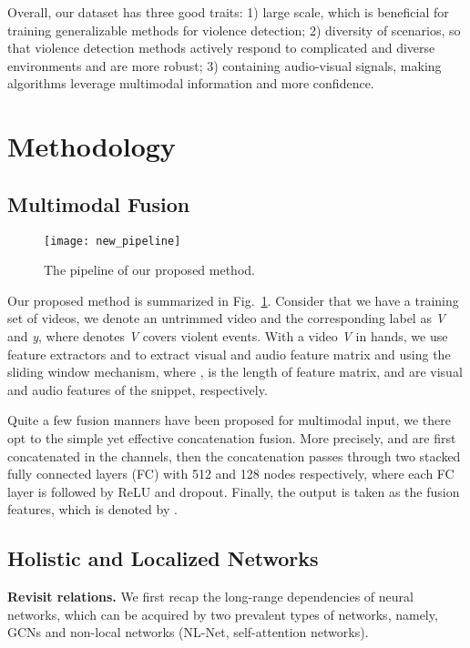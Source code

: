 \documentclass[runningheads]{llncs}
\begin{document}
Overall, our dataset has three good traits: 1) large scale, which is beneficial for training generalizable methods for violence detection; 2) diversity of scenarios, so that violence detection methods actively respond to complicated and diverse environments and are more robust; 3) containing audio-visual signals, making algorithms leverage multimodal information and more confidence.


\section{Methodology}
\subsection{Multimodal Fusion}

\begin{figure}[t]
\centering
\texttt{[image: new\_pipeline]}
\caption{The pipeline of our proposed method.}
\label{fig:pipeline}
\end{figure}
Our proposed method is summarized in Fig.~\ref{fig:pipeline}. Consider that we have a training set of videos, we denote an untrimmed video and the corresponding label as \textit{V} and \textit{y}, where  denotes \textit{V} covers violent events. With a video \textit{V} in hands, we use feature extractors  and  to extract visual and audio feature matrix  and  using the sliding window mechanism, where ,  is the length of feature matrix,  and  are visual and audio features of the  snippet, respectively. 

Quite a few fusion manners have been proposed for multimodal input, we there opt to the simple yet effective concatenation fusion. More precisely,  and  are first concatenated in the channels, then the concatenation passes through two stacked fully connected layers (FC) with 512 and 128 nodes respectively, where each FC layer is followed by ReLU and dropout. Finally, the output is taken as the fusion features, which is denoted by .

\subsection{Holistic and Localized Networks}

\textbf{Revisit relations.} We first recap the long-range dependencies of neural networks, which can be acquired by two prevalent types of networks, namely, GCNs and non-local networks (NL-Net, self-attention networks). 
\end{document}
